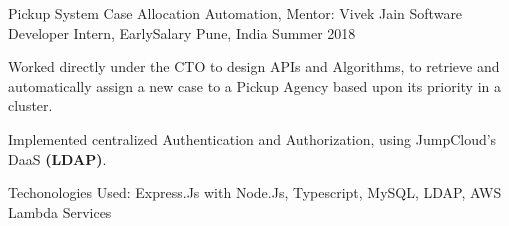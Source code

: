 \begin{cventries}
  \cventry
  {Pickup System Case Allocation Automation, Mentor: Vivek Jain}
  {Software Developer Intern, EarlySalary}
  {Pune, India}
  {Summer 2018}
  {
    \begin{cvitems}
	\item Worked directly under the CTO to design APIs and Algorithms, to retrieve and automatically assign a new case to a Pickup Agency based upon its priority in a cluster.
    \item Implemented centralized Authentication and Authorization, using JumpCloud’s DaaS \textbf{(LDAP)}.
\item Techonologies Used: Express.Js with Node.Js, Typescript, MySQL,
LDAP, AWS Lambda Services
    \end{cvitems}
  }

\end{cventries}

